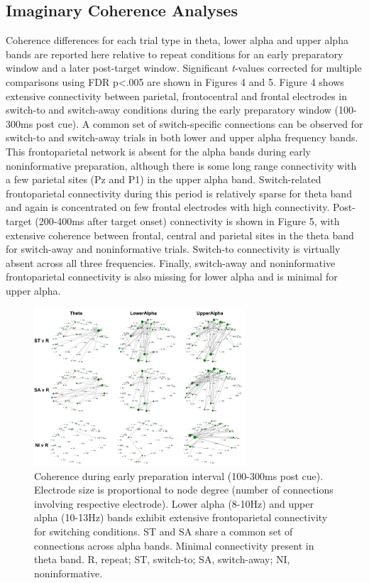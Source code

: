 \documentclass[preprint,authoryear,11pt,5p,times,twocolumns]{elsarticle}
\begin{document}
\subsection{Imaginary Coherence Analyses}
Coherence differences for each trial type in theta, lower alpha and upper alpha bands are reported here relative to repeat conditions for an early preparatory window and a later post-target window. Significant \emph{t}-values corrected for multiple comparisons using FDR p\textless.005 are shown in Figures 4 and 5. Figure 4 shows extensive connectivity between parietal, frontocentral and frontal electrodes in switch-to and switch-away conditions during the early preparatory window (100-300ms post cue). A common set of switch-specific connections can be observed for switch-to and switch-away trials in both lower and upper alpha frequency bands. This frontoparietal network is absent for the alpha bands during early noninformative preparation, although there is some long range connectivity with a few parietal sites (Pz and P1) in the upper alpha band. Switch-related frontoparietal connectivity during this period is relatively sparse for theta band and again is concentrated on few frontal electrodes with high connectivity. Post-target (200-400ms after target onset) connectivity is shown in Figure 5, with extensive coherence between frontal, central and parietal sites in the theta band for switch-away and noninformative trials. Switch-to connectivity is virtually absent across all three frequencies. Finally, switch-away and noninformative frontoparietal connectivity is also missing for lower alpha and is minimal for upper alpha.
\begin{figure}
\centering
\includegraphics[width = 0.7\textwidth]{100to300_connplots.pdf}
\caption{Coherence during early preparation interval (100-300ms post cue). Electrode size is proportional to node degree (number of connections involving respective electrode). Lower alpha (8-10Hz) and upper alpha (10-13Hz) bands exhibit extensive frontoparietal connectivity for switching conditions. ST and SA share a common set of connections across alpha bands. Minimal connectivity present in theta band. R, repeat; ST, switch-to; SA, switch-away; NI, noninformative.}
\label{CueCoherence}
\end{figure}
\end{document}

